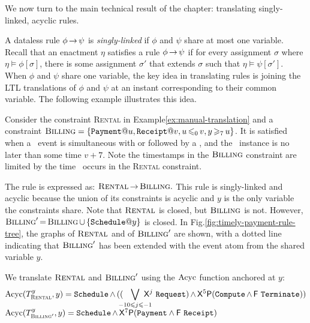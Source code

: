 We now turn to the main technical result
of the chapter:
translating singly-linked, acyclic rules.
  
A dataless rule $\phi\,{\rightarrow}\,\psi$
is {\em singly-linked}
if
$\phi$ and $\psi$
share at most one variable.
Recall that
an enactment $\eta$
satisfies a rule $\phi\,{\rightarrow}\,\psi$
if for every assignment $\sigma$ where $\eta\models\phi[\sigma]$,
there is some assignment $\sigma'$
that extends $\sigma$
such that $\eta\models\psi[\sigma']$.
When
$\phi$ and $\psi$ share one variable,
the key idea in translating rules is
joining the LTL translations of $\phi$ and $\psi$ 
at an instant corresponding to their common variable.
The following example illustrates this idea.


\begin{examp}\label{ex:rule-translation}
  Consider the constraint \textsc{Rental} in
  Example\:\ref{ex:manual-translation}
  and a constraint ${\textsc{Billing}}=
  \{\Payment@u,\Receipt@v,u\tight{\leq_0} v,y\tight{\geq_7}u\}$.
  It is satisfied when a \Payment\ event
  is simultaneous with or followed by a \Receipt,
  and the \Payment\ instance is no later than some time $v{+}7$.
  Note the timestamps in the $\textsc{Billing}$ constraint
  are limited by the time \Schedule\ occurs
  in the \textsc{Rental} constraint.
  
  The rule {\TimelyPayment} is expressed as:
  $
  {\textsc{Rental}}\,{\rightarrow}\,\textsc{Billing}.
  $
  This rule is singly-linked and acyclic because
  the union of its constraints is acyclic and
  $y$ is the only variable the constraints share.
  Note that ${\textsc{Rental}}$ is closed,
  but ${\textsc{Billing}}$ is not.
  However,
  $\textsc{Billing}'\tight=
  \textsc{Billing}\tight\cup\{\Schedule@y\}$ is closed.
  In Fig.\:\ref{fig:timely-payment-rule-tree},
  the graphs of ${\textsc{Rental}}$ and
  of $\textsc{Billing}'$ are shown,
  with a dotted line indicating that $\textsc{Billing}'$
  has been extended with the event atom from the shared variable $y$.

  We translate
  $\textsc{Rental}$ and $\textsc{Billing}'$
  using the $\text{Acyc}$ function anchored at $y$:
  $$
  \begin{array}{@{}l@{}}
  \Acyc(T_{\textsc{Rental}}^{y},y) =
    \Schedule\tight\land
    \displaystyle
    ((\hspace*{-2mm}\bigvee_{-10\leq j\leq -1}\hspace*{-4mm}{\sf X}^j\ \Request)
    \tight\land
    {\sf X}^5{\sf P}
    (\Compute\tight\land{\sf F}\ \Terminate))
  \\
    \Acyc(T_{\textsc{Billing}'}^{y},y) =
    \Schedule\tight\land{\sf X}^{7}{\sf P}
    (\Payment\land{\sf F}\ \Receipt)
  \end{array}
  $$


\end{examp}
